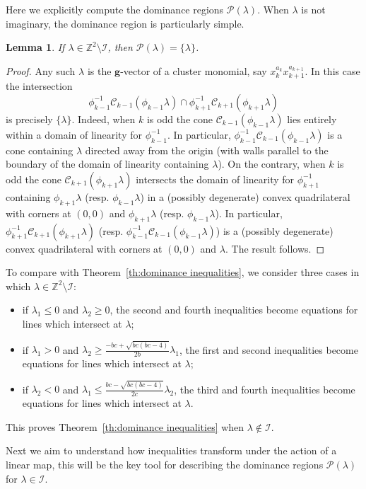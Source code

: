 \documentclass{amsart}
\newtheorem{lemma}[theorem]{Lemma}
\numberwithin{theorem}{section}
\newcommand{\bfg}{\boldsymbol{g}}
\newcommand{\cC}{\mathcal{C}}
\newcommand{\cI}{\mathcal{I}}
\newcommand{\cP}{\mathcal{P}}
\newcommand{\ZZ}{\mathbb{Z}}
\begin{document}
  Here we explicitly compute the dominance regions $\cP(\lambda)$.
  When $\lambda$ is not imaginary, the dominance region is particularly simple.
  \begin{lemma}
    If $\lambda\in\ZZ^2\setminus\cI$, then $\cP(\lambda)=\{\lambda\}$.
  \end{lemma}
  \begin{proof}
    Any such $\lambda$ is the $\bfg$-vector of a cluster monomial, say $x_k^{a_k}x_{k+1}^{a_{k+1}}$.
    In this case the intersection
    \[\phi_{k-1}^{-1}\cC_{k-1}(\phi_{k-1}\lambda) \cap \phi_{k+1}^{-1}\cC_{k+1}(\phi_{k+1}\lambda)\]
    is precisely $\{\lambda\}$. 
    Indeed, when $k$ is odd the cone $\cC_{k-1}(\phi_{k-1}\lambda)$ lies entirely within a domain of linearity for $\phi_{k-1}^{-1}$.
    In particular, $\phi_{k-1}^{-1}\cC_{k-1}(\phi_{k-1}\lambda)$ is a cone containing $\lambda$ directed away from the origin (with walls parallel to the boundary of the domain of linearity containing $\lambda$).
    On the contrary, when $k$ is odd the cone $\cC_{k+1}(\phi_{k+1}\lambda)$ intersects the domain of linearity for $\phi_{k+1}^{-1}$ containing $\phi_{k+1}\lambda$ (resp. $\phi_{k-1}\lambda$) in a (possibly degenerate) convex quadrilateral with corners at $(0,0)$ and $\phi_{k+1}\lambda$ (resp. $\phi_{k-1}\lambda$).
    In particular, $\phi_{k+1}^{-1}\cC_{k+1}(\phi_{k+1}\lambda)$ (resp. $\phi_{k-1}^{-1}\cC_{k-1}(\phi_{k-1}\lambda)$) is a (possibly degenerate) convex quadrilateral with corners at $(0,0)$ and $\lambda$.
    The result follows.
  \end{proof}
  To compare with Theorem~\ref{th:dominance inequalities}, we consider three cases in which $\lambda\in\ZZ^2\setminus\cI$:
  \begin{itemize}
    \item if $\lambda_1 \le 0$ and $\lambda_2 \ge 0$, the second and fourth inequalities become equations for lines which intersect at $\lambda$;
    \item if $\lambda_1 > 0$ and $\lambda_2 \ge \frac{-bc+\sqrt{bc(bc-4)}}{2b}\lambda_1$, the first and second inequalities become equations for lines which intersect at $\lambda$;
    \item if $\lambda_2 < 0$ and $\lambda_1 \le \frac{bc-\sqrt{bc(bc-4)}}{2c}\lambda_2$, the third and fourth inequalities become equations for lines which intersect at $\lambda$.
  \end{itemize}
  This proves Theorem~\ref{th:dominance inequalities} when $\lambda\notin\cI$.

  Next we aim to understand how inequalities transform under the action of a linear map, this will be the key tool for describing the dominance regions $\cP(\lambda)$ for $\lambda\in\cI$.
\end{document}
